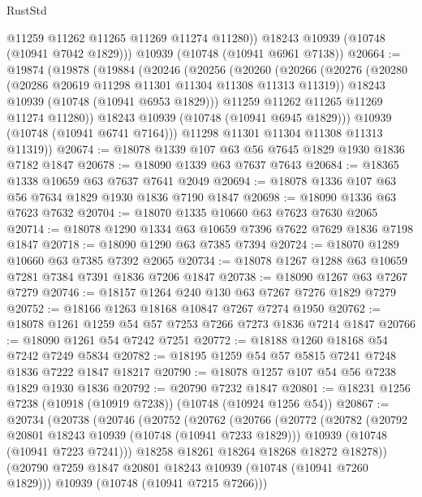 \begin{lexlean}{RustStd}
\begin{coremodule}
          @11259
          @11262
          @11265
          @11269
          @11274
          @11280))
      @18243
      @10939
      (@10748 (@10941 @7042 @1829)))
    @10939
    (@10748 (@10941 @6961 @7138))
@20664 := @19874
    (@19878
      (@19884
        (@20246
          (@20256
            (@20260
              (@20266
                (@20276
                  (@20280 (@20286 @20619 @11298 @11301 @11304 @11308 @11313 @11319))
                  @18243
                  @10939
                  (@10748 (@10941 @6953 @1829)))
                @11259
                @11262
                @11265
                @11269
                @11274
                @11280))
            @18243
            @10939
            (@10748 (@10941 @6945 @1829)))
          @10939
          (@10748 (@10941 @6741 @7164)))
        @11298
        @11301
        @11304
        @11308
        @11313
        @11319))
@20674 := @18078 @1339 @107 @63 @56 @7645 @1829 @1930 @1836 @7182 @1847
@20678 := @18090 @1339 @63 @7637 @7643
@20684 := @18365 @1338 @10659 @63 @7637 @7641 @2049
@20694 := @18078 @1336 @107 @63 @56 @7634 @1829 @1930 @1836 @7190 @1847
@20698 := @18090 @1336 @63 @7623 @7632
@20704 := @18070 @1335 @10660 @63 @7623 @7630 @2065
@20714 := @18078 @1290 @1334 @63 @10659 @7396 @7622 @7629 @1836 @7198 @1847
@20718 := @18090 @1290 @63 @7385 @7394
@20724 := @18070 @1289 @10660 @63 @7385 @7392 @2065
@20734 := @18078 @1267 @1288 @63 @10659 @7281 @7384 @7391 @1836 @7206 @1847
@20738 := @18090 @1267 @63 @7267 @7279
@20746 := @18157 @1264 @240 @130 @63 @7267 @7276 @1829 @7279
@20752 := @18166 @1263 @18168 @10847 @7267 @7274 @1950
@20762 := @18078 @1261 @1259 @54 @57 @7253 @7266 @7273 @1836 @7214 @1847
@20766 := @18090 @1261 @54 @7242 @7251
@20772 := @18188 @1260 @18168 @54 @7242 @7249 @5834
@20782 := @18195 @1259 @54 @57 @5815 @7241 @7248 @1836 @7222 @1847 @18217
@20790 := @18078 @1257 @107 @54 @56 @7238 @1829 @1930 @1836
@20792 := @20790 @7232 @1847
@20801 := @18231 @1256 @7238 (@10918 (@10919 @7238)) (@10748 (@10924 @1256 @54))
@20867 := @20734
    (@20738
      (@20746
        (@20752
          (@20762
            (@20766
              (@20772
                (@20782
                  (@20792 @20801 @18243 @10939 (@10748 (@10941 @7233 @1829)))
                  @10939
                  (@10748 (@10941 @7223 @7241)))
                @18258
                @18261
                @18264
                @18268
                @18272
                @18278))
            (@20790 @7259 @1847 @20801 @18243 @10939 (@10748 (@10941 @7260 @1829)))
            @10939
            (@10748 (@10941 @7215 @7266)))

\end{coremodule}
\end{lexlean}
